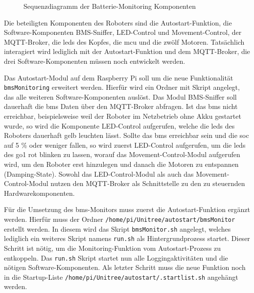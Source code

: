 \begin{figure}[h]
    \caption{Sequenzdiagramm der Batterie-Monitoring Komponenten}\label{fig:sequenz-bms}
\end{figure}

Die beteiligten Komponenten des Roboters sind die Autostart-Funktion, die Software-Komponenten BMS-Sniffer, LED-Control
und Movement-Control, der MQTT-Broker, die \glspl{led} des Kopfes, die \gls{mcu} und die zwölf Motoren.
Tatsächlich interagiert wird lediglich mit der Autostart-Funktion und dem MQTT-Broker, die drei Software-Komponenten müssen
noch entwickelt werden.

Das Autostart-Modul auf dem Raspberry Pi soll um die neue Funktionalität \texttt{bmsMonitoring} erweitert werden.
Hierfür wird ein Ordner mit Skript angelegt, das alle weiteren Software-Komponenten auslöst.
Das Modul BMS-Sniffer soll dauerhaft die \gls{bms} Daten über den MQTT-Broker abfragen.
Ist das \gls{bms} nicht erreichbar, beispielsweise weil der Roboter im Netzbetrieb ohne Akku gestartet wurde,
so wird die Komponente LED-Control aufgerufen, welche die \glspl{led} des Roboters dauerhaft gelb leuchten lässt.
Sollte das \gls{bms} erreichbar sein und die \gls{soc} auf \num{5} \% oder weniger fallen, so wird zuerst LED-Control
aufgerufen, um die \glspl{led} des \gls{go1} rot blinken zu lassen, worauf das Movement-Control-Modul aufgerufen wird,
um den Roboter erst hinzulegen und danach die Motoren zu entspannen (Damping-State).
Sowohl das LED-Control-Modul als auch das Movement-Control-Modul nutzen den MQTT-Broker als Schnittstelle zu den zu steuernden
Hardwarekomponenten.


Für die Umsetzung des \gls{bms}-Monitors muss zuerst die Autostart-Funktion ergänzt werden.
Hierfür muss der Ordner \texttt{/home/\allowbreak pi/\allowbreak Unitree/\allowbreak autostart/\allowbreak bmsMonitor}
erstellt werden.
In diesem wird das Skript \texttt{bmsMonitor.sh} angelegt, welches lediglich ein weiteres Skript namens \texttt{run.sh}
als Hintergrundprozess startet.
Dieser Schritt ist nötig, um die Monitoring-Funktion vom Autostart-Prozess zu entkoppeln.
Das \texttt{run.sh} Skript startet nun alle Loggingaktivitäten und die nötigen Software-Komponenten.
Als letzter Schritt muss die neue Funktion noch in die Startup-Liste
\texttt{/home/pi/Unitree/autostart/.startlist.sh}
angehängt werden.

